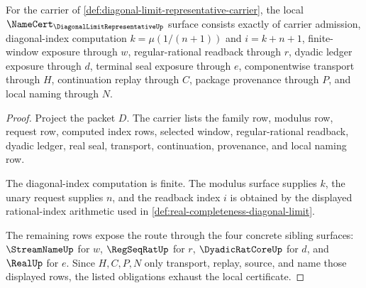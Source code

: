 \begin{theorem}
\label{thm:diagonal-limit-representative-namecert-obligations}
For the carrier of \autoref{def:diagonal-limit-representative-carrier}, the local $\NameCert_{\DiagonalLimitRepresentativeUp}$ surface consists exactly of carrier admission, diagonal-index computation $k=\mu(1/(n+1))$ and $i=k+n+1$, finite-window exposure through $w$, regular-rational readback through $r$, dyadic ledger exposure through $d$, terminal seal exposure through $e$, componentwise transport through $H$, continuation replay through $C$, package provenance through $P$, and local naming through $N$.
\end{theorem}
\begin{proof}
Project the packet $D$. The carrier lists the family row, modulus row, request row, computed index rows, selected window, regular-rational readback, dyadic ledger, real seal, transport, continuation, provenance, and local naming row.

The diagonal-index computation is finite. The modulus surface supplies $k$, the unary request supplies $n$, and the readback index $i$ is obtained by the displayed rational-index arithmetic used in \autoref{def:real-completeness-diagonal-limit}.

The remaining rows expose the route through the four concrete sibling surfaces: $\StreamNameUp$ for $w$, $\RegSeqRatUp$ for $r$, $\DyadicRatCoreUp$ for $d$, and $\RealUp$ for $e$. Since $H,C,P,N$ only transport, replay, source, and name those displayed rows, the listed obligations exhaust the local certificate.
\end{proof}

